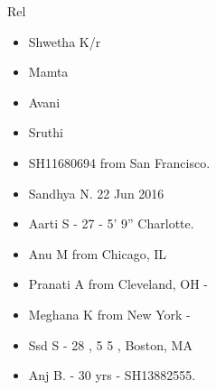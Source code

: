 \documentclass[serif, mathserif, final]{beamer}
\begin{document}
\begin{frame}
\begin{columns}
\begin{column}{0.25\linewidth}
\begin{block}{Rel} 
  \begin{itemize} 
  \small \item \small Shwetha K/r
    \item \small Mamta
    \item \small Avani 
    \item \small Sruthi 
    \item \small SH11680694 from San Francisco. 
    \item \small Sandhya N. 22 Jun 2016 
    \item \small Aarti S - 27 - 5' 9'' Charlotte.       
    \item \small Anu M from Chicago, IL 
    \item \small Pranati A from Cleveland, OH - 
    \item \small Meghana K from New York - 
    \item \small Ssd S - 28 , 5 5 , Boston, MA 
    \item \small Anj B. - 30 yrs - SH13882555.
  \end{itemize}
\end{block} 

\end{column}%
\end{columns}
\end{frame}
\end{document}
